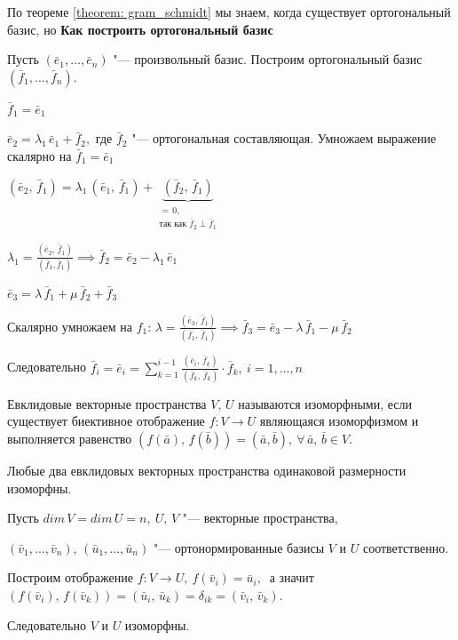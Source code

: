 По теореме \ref{theorem: gram_schmidt} мы знаем, когда существует ортогональный базис, но
\textbf{Как построить ортогональный базис}

Пусть $(\bar{e}_1, \ldots, \bar{e}_n)$ "--- произвольный базис. Построим ортогональный базис $(\bar{f}_1, \ldots, \bar{f}_n)$.

$\bar{f}_1 = \bar{e}_1$

$\bar{e}_2 = \lambda_1 \, \bar{e}_1 + \bar{f}_2,$ где $\bar{f}_2$ "--- ортогональная составляющая. Умножаем выражение скалярно на $\bar{f}_1 = \bar{e}_1$ 

$(\bar{e}_2, \, \bar{f}_1) = \lambda_1 \, (\bar{e}_1, \, \bar{f}_1) + \underbrace{(\bar{f}_2,\, \bar{f}_1)}_{\substack{= \, 0, \\ \text{так как } \bar{f}_2 \; \bot \; \bar{f}_1}}$

$\lambda_1 = \frac{(\bar{e}_2, \, \bar{f}_1)}{(\bar{f}_1, \bar{f}_1)} \implies \bar{f}_2 = \bar{e}_2 - \lambda_1 \, \bar{e}_1$

$\bar{e}_3 = \lambda \, \bar{f}_1 + \mu \, \bar{f}_2 + \bar{f}_3$

Скалярно умножаем на $f_1$: $\lambda = \frac{(\bar{e}_3, \, \bar{f}_1)}{(\bar{f}_1, \, \bar{f}_1)} \implies \bar{f}_3 = \bar{e}_3 - \lambda \, \bar{f}_1 - \mu \, \bar{f}_2$

Следовательно $\bar{f}_i = \bar{e}_i = \sum\limits_{k = 1}^{i - 1} \frac{(\bar{e}_i, \, \bar{f}_k)}{(\bar{f}_k, \, \bar{f}_ k)} \cdot \bar{f}_k, ~ i = 1, \ldots, n$

\begin{definition}
  Евклидовые векторные пространства $V, \, U$ называются изоморфными, если существует биективное отображение $f: V \to U$ являющаяся изоморфизмом и выполняется равенство $(f(\bar{a}), \, f(\bar{b})) = (\bar{a}, \bar{b}),~ \forall \, \bar{a}, \, \bar{b} \in V.$
\end{definition}

\begin{theorem}
  Любые два евклидовых векторных пространства одинаковой размерности изоморфны.
\end{theorem}
\begin{Proof}
  Пусть $dim \, V = dim \, U = n,~ U,\, V$ "--- векторные пространства,

  $(\bar{v}_1, \ldots, \bar{v}_n), \, (\bar{u}_1, \ldots, \bar{u}_n)$ "--- ортонормированные базисы $V$ и $U$ соответственно.

  Построим отображение
  $f: V \to U, ~f(\bar{v}_i) = \bar{u}_i,~$ а значит $(f(\bar{v}_i), \, f(\bar{v}_k)) = (\bar{u}_i, \, \bar{u}_k) = \delta_{ik} = (\bar{v}_i, \, \bar{v}_k)$.

  Следовательно $V$ и $U$ изоморфны.
\end{Proof}

